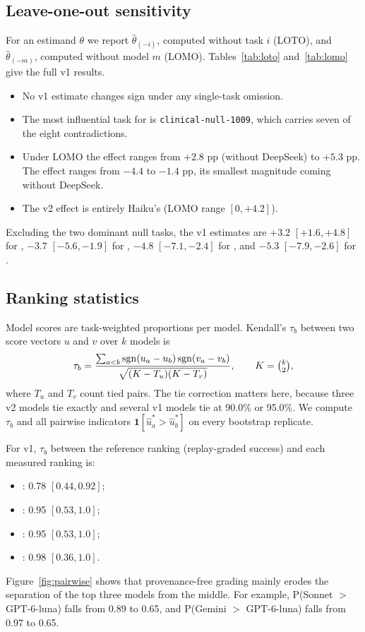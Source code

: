\subsection{Leave-one-out sensitivity}
\label{app:sens}
For an estimand $\theta$ we report $\hat\theta_{(-i)}$, computed without task
$i$ (LOTO), and $\hat\theta_{(-m)}$, computed without model $m$ (LOMO).
Tables~\ref{tab:loto} and~\ref{tab:lomo} give the full v1 results.
\begin{itemize}
\item No v1 estimate changes sign under any single-task omission.
\item The most influential task for  is
\texttt{clinical-null-1009}, which carries seven of the eight contradictions.
\item Under LOMO the  effect ranges from $+2.8$ pp (without
DeepSeek) to $+5.3$ pp. The  effect ranges from $-4.4$ to $-1.4$
pp, its smallest magnitude coming without DeepSeek.
\item The v2  effect is entirely Haiku's (LOMO range
$[0,+4.2]$).
\end{itemize}
Excluding the two dominant null tasks, the v1 estimates are $+3.2$
$[+1.6,+4.8]$ for , $-3.7$ $[-5.6,-1.9]$ for , $-4.8$
$[-7.1,-2.4]$ for , and $-5.3$ $[-7.9,-2.6]$ for .




\subsection{Ranking statistics}
\label{app:stats-rank}
Model scores are task-weighted proportions per model. Kendall's $\tau_b$
between two score vectors $u$ and $v$ over $k$ models is
\begin{equation}
\tau_b=\frac{\sum_{a<b}\mathrm{sgn}(u_a-u_b)\,\mathrm{sgn}(v_a-v_b)}{\sqrt{(K-T_u)(K-T_v)}},\qquad K=\tbinom{k}{2},
\end{equation}
where $T_u$ and $T_v$ count tied pairs. The tie correction matters here,
because three v2 models tie exactly and several v1 models tie at 90.0\% or
95.0\%. We compute $\tau_b$ and all pairwise indicators
$\mathbf{1}[\hat u^*_a>\hat u^*_b]$ on every bootstrap replicate.

For v1, $\tau_b$ between the reference ranking (replay-graded success) and each
measured ranking is:
\begin{itemize}
\item {}: 0.78 $[0.44,0.92]$;
\item {}: 0.95 $[0.53,1.0]$;
\item {}: 0.95 $[0.53,1.0]$;
\item {}: 0.98 $[0.36,1.0]$.
\end{itemize}
Figure~\ref{fig:pairwise} shows that provenance-free grading mainly erodes
the separation of the top three models from the middle. For example,
P(Sonnet $>$ GPT-6-luna) falls from 0.89 to 0.65, and P(Gemini $>$ GPT-6-luna)
falls from 0.97 to 0.65.

